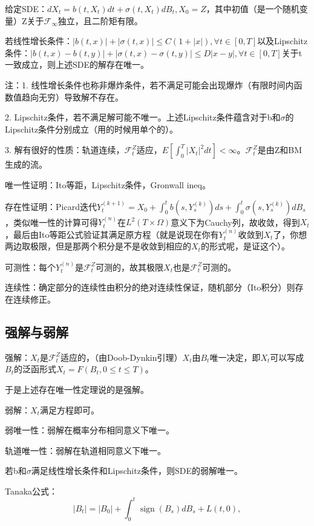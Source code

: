 给定SDE：$d X_{t}=b\left(t, X_{t}\right) d t+\sigma\left(t, X_{t}\right) d B_{t}, X_{0}=Z$，其中初值（是一个随机变量）Z关于$\mathcal{F}_{\infty}$独立，且二阶矩有限。

若线性增长条件：$|b(t, x)|+|\sigma(t, x)| \leq C(1+|x|), \forall t \in[0, T]$以及Lipschitz条件：$|b(t, x)-b(t, y)|+|\sigma(t, x)-\sigma(t, y)| \leq D|x-y|, \forall t \in[0, T]$关于t一致成立，则上述SDE的解存在唯一。

注：1. 线性增长条件也称非爆炸条件，若不满足可能会出现爆炸（有限时间内函数值趋向无穷）导致解不存在。

2. Lipschitz条件，若不满足解可能不唯一。上述Lipschitz条件蕴含对于b和$\sigma$的Lipschitz条件分别成立（用的时候用单个的）。

3. 解有很好的性质：轨道连续，$\mathcal{F}_{t}^{Z}$适应，$E\left[\int_{0}^{T}|X_{t}|^{2} d t\right]<\infty$。$\mathcal{F}_{t}^{Z}$是由Z和BM生成的流。

唯一性证明：Ito等距，Lipschitz条件，Gronwall ineq。

存在性证明：Picard迭代$Y_{t}^{(k+1)}=X_{0}+\int_{0}^{t} b\left(s, Y_{s}^{(k)}\right) d s+\int_{0}^{t} \sigma\left(s, Y_{s}^{(k)}\right) d B_{s}$，类似唯一性的计算可得$Y_t^{(n)}$在$L^2(T \times \Omega)$意义下为Cauchy列，故收敛，得到$X_t$，最后由Ito等距公式验证其满足原方程（就是说现在你有$Y_t^{(n)}$收敛到$X_t$了，你想两边取极限，但是那两个积分是不是收敛到相应的$X_t$的形式呢，是证这个）。

可测性：每个$Y_t^{(n)}$是$\mathcal{F}_{t}^{Z}$可测的，故其极限$X_t$也是$\mathcal{F}_{t}^{Z}$可测的。

连续性：确定部分的连续性由积分的绝对连续性保证，随机部分（Ito积分）则存在连续修正。

\subsection{强解与弱解}

强解：$X_t$是$\mathcal{F}_t^Z$适应的，（由Doob-Dynkin引理）$X_t$由$B_t$唯一决定，即$X_t$可以写成$B_t$的泛函形式$X_t = F(B_t, 0 \le t \le T)$。

于是上述存在唯一性定理说的是强解。

弱解：$X_t$满足方程即可。

弱唯一性：弱解在概率分布相同意义下唯一。

轨道唯一性：弱解在轨道相同意义下唯一。

若b和$\sigma$满足线性增长条件和Lipschitz条件，则SDE的弱解唯一。

Tanaka公式：
\[
  |B_{t}|=|B_{0}|+\int_{0}^{t} \operatorname{sign}\left(B_{s}\right) d B_{s}+L(t, 0),
\]

